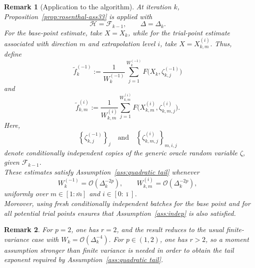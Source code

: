 \documentclass[11pt,a4paper]{article}
\newtheorem{remark}{Remark}[section]
\newcommand{\Imax}{\bar{\imath}}%
\begin{document}
\begin{remark}[Application to the algorithm]
At iteration \(k\), Proposition~\ref{prop:rosenthal-ass33} is applied with
\[
    \mathcal H=\mathcal F_{k-1},
    \qquad
    \Delta=\Delta_k.
\]
For the base-point estimate, take \(X=X_k\), while for the trial-point estimate associated with direction \(m\) and extrapolation level \(i\), take $X=X_{k,m}^{(i)}.$
Thus, define
\[
    \tilde f_k^{(-1)}
    :=
    \frac{1}{W_k^{(-1)}}
    \sum_{j=1}^{W_k^{(-1)}}
    F\bigl(X_k,\zeta_{k,j}^{(-1)}\bigr)
\]
and
\[
    \tilde f_{k,m}^{(i)}
    :=
    \frac{1}{W_{k,m}^{(i)}}
    \sum_{j=1}^{W_{k,m}^{(i)}}
    F\bigl(X_{k,m}^{(i)},\zeta_{k,m,j}^{(i)}\bigr).
\]
Here,
\[
    \left\{\zeta_{k,j}^{(-1)}\right\}_{j}
    \quad\text{and}\quad
    \left\{\zeta_{k,m,j}^{(i)}\right\}_{m,i,j}
\]
denote conditionally independent copies of the generic oracle random variable \(\zeta\), given \(\mathcal F_{k-1}\).\\
These estimates satisfy Assumption~\ref{ass:quadratic tail} whenever
\[
    W_k^{(-1)}
    =
    \mathcal O(\Delta_k^{-2p}),
    \qquad
    W_{k,m}^{(i)}
    =
    \mathcal O(\Delta_k^{-2p}),
\]
uniformly over \(m\in[1:\bar m]\) and \(i\in[0:\Imax]\).\\
Moreover, using fresh conditionally independent batches for the base point and for all potential trial points ensures that
Assumption~\ref{ass:indep} is also satisfied.
\end{remark}
\begin{remark}
For $p=2$, one has $r=2$, and the result reduces to the usual finite-variance
case with
$W_k=\mathcal O(\Delta_k^{-4}).$
For $p\in(1,2)$, one has $r>2$, so a moment assumption stronger than finite
variance is needed in order to obtain the tail exponent required by
Assumption~\ref{ass:quadratic tail}.
\end{remark}



\end{document}
